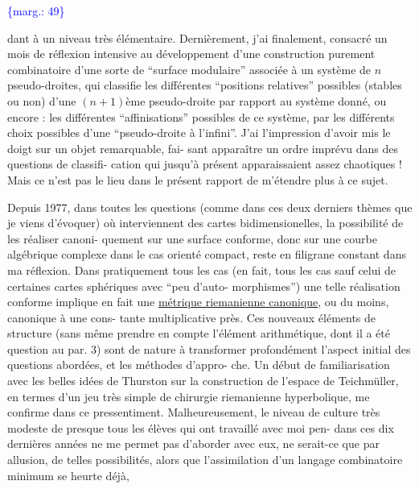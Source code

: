 \documentclass[11pt]{article}
\newcommand{\scanpage}[1]{\par\bigskip\noindent{\small\sffamily[scan #1]}\par}
\newcommand{\mspage}[1]{{\small\sffamily[p.\,#1]}}
\newcommand{\margin}[1]{\textcolor{blue}{\{\textsf{marg.:} #1\}}}
\newcommand{\uline}[1]{\underline{#1}}
\begin{document}
\margin{49}

\clearpage
\scanpage{119/50}
\mspage{48}

dant à un niveau très élémentaire. Dernièrement, j'ai finalement,
consacré un mois de réflexion intensive au développement d'une
construction purement combinatoire d'une sorte de ``surface modulaire''
associée à un système de $n$ pseudo-droites, qui classifie les
différentes ``positions relatives'' possibles (stables ou non) d'une
$(n+1)$ème pseudo-droite par rapport au système donné, ou encore :
les différentes ``affinisations'' possibles de ce système, par les
différents choix possibles d'une ``pseudo-droite à l'infini''. J'ai
l'impression d'avoir mis le doigt sur un objet remarquable, fai-%
sant apparaître un ordre imprévu dans des questions de classifi-%
cation qui jusqu'à présent apparaissaient assez chaotiques !
Mais ce n'est pas le lieu dans le présent rapport de m'étendre plus
à ce sujet.

Depuis 1977, dans toutes les questions (comme dans ces
deux derniers thèmes que je viens d'évoquer) où interviennent des
cartes bidimensionelles, la possibilité de les réaliser canoni-%
quement sur une surface conforme, donc sur une courbe algébrique
complexe dans le cas orienté compact, reste en filigrane constant
dans ma réflexion. Dans pratiquement tous les cas (en fait, tous
les cas sauf celui de certaines cartes sphériques avec ``peu d'auto-%
morphismes'') une telle réalisation conforme implique en fait une
\uline{métrique riemanienne canonique}, ou du moins, canonique à une cons-%
tante multiplicative près. Ces nouveaux éléments de structure
(sans même prendre en compte l'élément arithmétique, dont il a
été question au par. 3) sont de nature à transformer profondément
l'aspect initial des questions abordées, et les méthodes d'appro-%
che. Un début de familiarisation avec les belles idées de Thurston
sur la construction de l'espace de Teichmüller, en termes d'un jeu
très simple de chirurgie riemanienne hyperbolique, me confirme
dans ce pressentiment. Malheureusement, le niveau de culture très
modeste de presque tous les élèves qui ont travaillé avec moi pen-%
dans ces dix dernières années ne me permet pas d'aborder avec eux,
ne serait-ce que par allusion, de telles possibilités, alors que
l'assimilation d'un langage combinatoire minimum se heurte déjà,
\end{document}
